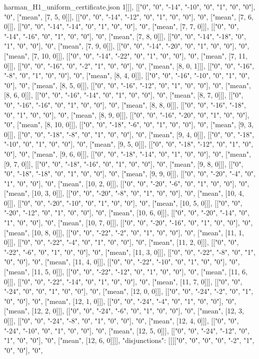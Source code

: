 \begin{filecontents*}[overwrite]{harman_H1_uniform_certificate.json}
1]]], [["0", "0", "-14", "-10", "0", "1", "0", "0"], "0", ["mean", [7, 5, 0]]], [["0", "0", "-14", "-12", "0", "1", "0", "0"], "0", ["mean", [7, 6, 0]]], [["0", "0", "-14", "-14", "0", "1", "0", "0"], "0", ["mean", [7, 7, 0]]], [["0", "0", "-14", "-16", "0", "1", "0", "0"], "0", ["mean", [7, 8, 0]]], [["0", "0", "-14", "-18", "0", "1", "0", "0"], "0", ["mean", [7, 9, 0]]], [["0", "0", "-14", "-20", "0", "1", "0", "0"], "0", ["mean", [7, 10, 0]]], [["0", "0", "-14", "-22", "0", "1", "0", "0"], "0", ["mean", [7, 11, 0]]], [["0", "0", "-16", "0", "-2", "1", "0", "0"], "0", ["mean", [8, 0, 1]]], [["0", "0", "-16", "-8", "0", "1", "0", "0"], "0", ["mean", [8, 4, 0]]], [["0", "0", "-16", "-10", "0", "1", "0", "0"], "0", ["mean", [8, 5, 0]]], [["0", "0", "-16", "-12", "0", "1", "0", "0"], "0", ["mean", [8, 6, 0]]], [["0", "0", "-16", "-14", "0", "1", "0", "0"], "0", ["mean", [8, 7, 0]]], [["0", "0", "-16", "-16", "0", "1", "0", "0"], "0", ["mean", [8, 8, 0]]], [["0", "0", "-16", "-18", "0", "1", "0", "0"], "0", ["mean", [8, 9, 0]]], [["0", "0", "-16", "-20", "0", "1", "0", "0"], "0", ["mean", [8, 10, 0]]], [["0", "0", "-18", "-6", "0", "1", "0", "0"], "0", ["mean", [9, 3, 0]]], [["0", "0", "-18", "-8", "0", "1", "0", "0"], "0", ["mean", [9, 4, 0]]], [["0", "0", "-18", "-10", "0", "1", "0", "0"], "0", ["mean", [9, 5, 0]]], [["0", "0", "-18", "-12", "0", "1", "0", "0"], "0", ["mean", [9, 6, 0]]], [["0", "0", "-18", "-14", "0", "1", "0", "0"], "0", ["mean", [9, 7, 0]]], [["0", "0", "-18", "-16", "0", "1", "0", "0"], "0", ["mean", [9, 8, 0]]], [["0", "0", "-18", "-18", "0", "1", "0", "0"], "0", ["mean", [9, 9, 0]]], [["0", "0", "-20", "-4", "0", "1", "0", "0"], "0", ["mean", [10, 2, 0]]], [["0", "0", "-20", "-6", "0", "1", "0", "0"], "0", ["mean", [10, 3, 0]]], [["0", "0", "-20", "-8", "0", "1", "0", "0"], "0", ["mean", [10, 4, 0]]], [["0", "0", "-20", "-10", "0", "1", "0", "0"], "0", ["mean", [10, 5, 0]]], [["0", "0", "-20", "-12", "0", "1", "0", "0"], "0", ["mean", [10, 6, 0]]], [["0", "0", "-20", "-14", "0", "1", "0", "0"], "0", ["mean", [10, 7, 0]]], [["0", "0", "-20", "-16", "0", "1", "0", "0"], "0", ["mean", [10, 8, 0]]], [["0", "0", "-22", "-2", "0", "1", "0", "0"], "0", ["mean", [11, 1, 0]]], [["0", "0", "-22", "-4", "0", "1", "0", "0"], "0", ["mean", [11, 2, 0]]], [["0", "0", "-22", "-6", "0", "1", "0", "0"], "0", ["mean", [11, 3, 0]]], [["0", "0", "-22", "-8", "0", "1", "0", "0"], "0", ["mean", [11, 4, 0]]], [["0", "0", "-22", "-10", "0", "1", "0", "0"], "0", ["mean", [11, 5, 0]]], [["0", "0", "-22", "-12", "0", "1", "0", "0"], "0", ["mean", [11, 6, 0]]], [["0", "0", "-22", "-14", "0", "1", "0", "0"], "0", ["mean", [11, 7, 0]]], [["0", "0", "-24", "0", "0", "1", "0", "0"], "0", ["mean", [12, 0, 0]]], [["0", "0", "-24", "-2", "0", "1", "0", "0"], "0", ["mean", [12, 1, 0]]], [["0", "0", "-24", "-4", "0", "1", "0", "0"], "0", ["mean", [12, 2, 0]]], [["0", "0", "-24", "-6", "0", "1", "0", "0"], "0", ["mean", [12, 3, 0]]], [["0", "0", "-24", "-8", "0", "1", "0", "0"], "0", ["mean", [12, 4, 0]]], [["0", "0", "-24", "-10", "0", "1", "0", "0"], "0", ["mean", [12, 5, 0]]], [["0", "0", "-24", "-12", "0", "1", "0", "0"], "0", ["mean", [12, 6, 0]]]], "disjunctions": [[[["0", "0", "0", "0", "-2", "1", "0", "0"], "0", 
\end{filecontents*}
